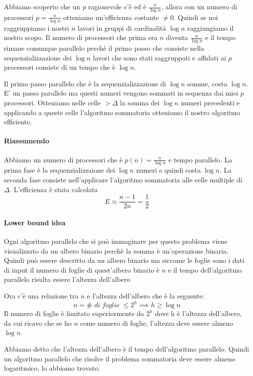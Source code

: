 Abbiamo scoperto che un \textit{p} ragionevole c'è ed è $\frac{n}{\log n}$, allora con un numero di processori $p = \frac{n}{\log n}$ otteniamo un'efficienza costante $\neq 0$. Quindi se noi raggruppiamo i nostri $n$ lavori in gruppi di cardinalità $\log n$ raggiungiamo il nostro scopo. Il numero di processori che prima era $n$ diventa $\frac{n}{\log n}$ e il tempo rimane comunque parallelo perchè il primo passo che consiste nella sequenzializzazione dei $\log n$ lavori che sono stati raggruppati e affidati ai $p$ processori consiste di un tempo che è $\log n$.

 Il primo passo parallelo che è la sequenzializzazione di $\log n$ somme, costa $\log n$. E' un passo parallelo ma questi numeri vengono sommati in sequenza dai miei $p$ processori. Otteniamo nelle celle $> \Delta$ la somma dei $\log n$ numeri precedenti e applicando a queste celle l'algoritmo sommatoria otteniamo il nostro algoritmo efficiente.

\paragraph{Riassumendo}
Abbiamo un numero di processori che è $p(n) = \frac{n}{\log n}$ e tempo parallelo. La prima fase è la sequenzializzaione dei $\log n$ numeri e quindi costa $\log n$. La seconda fase consiste nell'applicare l'algoritmo sommatoria alle celle multiple di $\Delta$.
L'efficienza è stata calcolata
$$E \approx \frac{n-1}{2n} = \frac{1}{2}$$

\paragraph{Lower bound idea} Ogni algoritmo parallelo che si può immaginare per questo problema viene visualizzato da un albero binario perchè la somma è un'operazione binaria. Quindi può essere descritto da un albero binario ma siccome le foglie sono i dati di input il numero di foglie di quest'albero binario è $n$ e il tempo dell'algoritmo parallelo risulta essere l'altezza dell'albero

Ora c'è una relazione tra $n$ e l'altezza dell'albero che è la seguente: 
$$n = \#\;di\;foglie\; \leq 2^h \implies h \geq \log n$$
Il numero di foglie è limitato superiormente da $2^h$ dove h è l'altezza dell'albero, da cui ricavo che se ho $n$ come numero di foglie, l'altezza deve essere almeno $\log n$.

Abbiamo detto che l'altezza dell'albero è il tempo dell'algoritmo parallelo. Quindi un algoritmo parallelo che risolve il problema sommatoria deve essere almeno logaritmico, lo abbiamo trovato.


